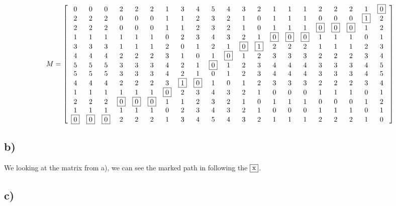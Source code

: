 \[ M = 
\left[
\begin{array}{cccccccccccccccccccccc}
 0 & 0 & 0 & 2 & 2 & 2 & 1 & 3 & 4 & 5 & 4 						& 3 & 2 & 1 & 1 & 1 & 2 & 2 & 2 & 1 & \fbox{0} \\
 2 & 2 & 2 & 0 & 0 & 0 & 1 & 1 & 2 & 3 & 2 						& 1 & 0 & 1 & 1 & 1 & 0 & 0 & 0 & \fbox{1} & 2 \\
 2 & 2 & 2 & 0 & 0 & 0 & 1 & 1 & 2 & 3 & 2 						& 1 & 0 & 1 & 1 & 1 & \fbox{0} & \fbox{0} & \fbox{0} & 1 & 2 \\
 1 & 1 & 1 & 1 & 1 & 1 & 0 & 2 & 3 & 4 & 3 						& 2 & 1 & \fbox{0} & \fbox{0} & \fbox{0} & 1 & 1 & 1 & 0 & 1 \\
 3 & 3 & 3 & 1 & 1 & 1 & 2 & 0 & 1 				 & 2 & 1 		& \fbox{0} & \fbox{1} & 2 & 2 & 2 & 1 & 1 & 1 & 2 & 3 \\
 4 & 4 & 4 & 2 & 2 & 2 & 3 & 1 & 0 & 1 & 			   \fbox{0}	& 1 & 2 & 3 & 3 & 3 & 2 & 2 & 2 & 3 & 4 \\
 5 & 5 & 5 & 3 & 3 & 3 & 4 & 2 & 1 & 			   \fbox{0} & 1	& 2 & 3 & 4 & 4 & 4 & 3 & 3 & 3 & 4 & 5 \\
 5 & 5 & 5 & 3 & 3 & 3 & 4 & 2 & 1 						& 0 & 1	& 2 & 3 & 4 & 4 & 4 & 3 & 3 & 3 & 4 & 5 \\
 4 & 4 & 4 & 2 & 2 & 2 & 3 & \fbox{1} & \fbox{0} 		& 1 & 0	& 1 & 2 & 3 & 3 & 3 & 2 & 2 & 2 & 3 & 4 \\
 1 & 1 & 1 & 1 & 1 & 1 & \fbox{0} & 2 & 3 & 4 				& 3	& 2 & 1 & 0 & 0 & 0 & 1 & 1 & 1 & 0 & 1 \\
 2 & 2 & 2 & \fbox{0} & \fbox{0} & \fbox{0} & 1 & 1 & 2 & 3 & 2	& 1 & 0 & 1 & 1 & 1 & 0 & 0 & 0 & 1 & 2 \\
 1 & 1 & 1 & 1 & 1 & 1 & 0 & 2 & 3 & 4 						& 3	& 2 & 1 & 0 & 0 & 0 & 1 & 1 & 1 & 0 & 1 \\
 \fbox{0} & \fbox{0} & \fbox{0} & 2 & 2 & 2 & 1 & 3 & 4 & 5 & 4 & 3 & 2 & 1 & 1 & 1 & 2 & 2 & 2 & 1 & 0 \\
\end{array}
\right]
\]


\subsection*{b)} %
\label{sub:b}

We looking at the matrix from a), we can see the marked path in following the $\fbox{x}$.


\subsection*{c)} %
\label{sub:c}
